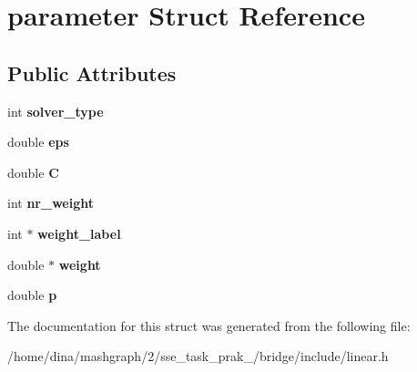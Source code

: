 \hypertarget{structparameter}{\section{parameter Struct Reference}
\label{structparameter}
}
\subsection*{Public Attributes}
\begin{DoxyCompactItemize}
\item 
\hypertarget{structparameter_acc5b033dc81575d58a0c9550f9023bef}{int {\bfseries solver\-\_\-type}}\label{structparameter_acc5b033dc81575d58a0c9550f9023bef}

\item 
\hypertarget{structparameter_a88f201649fa923449b98782d93d54680}{double {\bfseries eps}}\label{structparameter_a88f201649fa923449b98782d93d54680}

\item 
\hypertarget{structparameter_a21fff5940ff19f227775818dda6d2b26}{double {\bfseries C}}\label{structparameter_a21fff5940ff19f227775818dda6d2b26}

\item 
\hypertarget{structparameter_af7d691249aff7ed79f0f7994552e1540}{int {\bfseries nr\-\_\-weight}}\label{structparameter_af7d691249aff7ed79f0f7994552e1540}

\item 
\hypertarget{structparameter_a94ccb984d331ac406ec6b619b658d8ef}{int $\ast$ {\bfseries weight\-\_\-label}}\label{structparameter_a94ccb984d331ac406ec6b619b658d8ef}

\item 
\hypertarget{structparameter_afc3184b4828cbb0e1499078607630ca6}{double $\ast$ {\bfseries weight}}\label{structparameter_afc3184b4828cbb0e1499078607630ca6}

\item 
\hypertarget{structparameter_a6dc25ec8cb3664408e34432d5710510c}{double {\bfseries p}}\label{structparameter_a6dc25ec8cb3664408e34432d5710510c}

\end{DoxyCompactItemize}


The documentation for this struct was generated from the following file\-:\begin{DoxyCompactItemize}
\item 
/home/dina/mashgraph/2/sse\-\_\-task\-\_\-prak\-\_/bridge/include/linear.\-h\end{DoxyCompactItemize}
